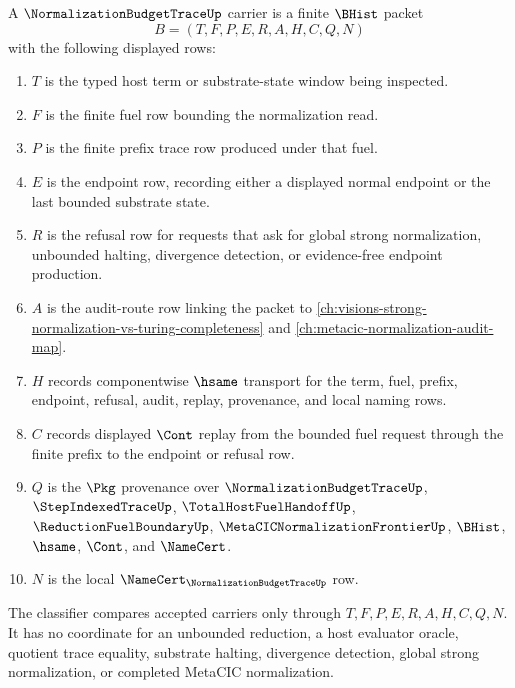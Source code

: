 \begin{definition}
\label{def:normalization-budget-trace-carrier}
A $\NormalizationBudgetTraceUp$ carrier is a finite $\BHist$ packet
$$
B=(T,F,P,E,R,A,H,C,Q,N)
$$
with the following displayed rows:
\begin{enumerate}
\item $T$ is the typed host term or substrate-state window being inspected.
\item $F$ is the finite fuel row bounding the normalization read.
\item $P$ is the finite prefix trace row produced under that fuel.
\item $E$ is the endpoint row, recording either a displayed normal endpoint or the last bounded substrate state.
\item $R$ is the refusal row for requests that ask for global strong normalization, unbounded halting, divergence detection, or evidence-free endpoint production.
\item $A$ is the audit-route row linking the packet to \autoref{ch:visions-strong-normalization-vs-turing-completeness} and \autoref{ch:metacic-normalization-audit-map}.
\item $H$ records componentwise $\hsame$ transport for the term, fuel, prefix, endpoint, refusal, audit, replay, provenance, and local naming rows.
\item $C$ records displayed $\Cont$ replay from the bounded fuel request through the finite prefix to the endpoint or refusal row.
\item $Q$ is the $\Pkg$ provenance over $\NormalizationBudgetTraceUp$, $\StepIndexedTraceUp$, $\TotalHostFuelHandoffUp$, $\ReductionFuelBoundaryUp$, $\MetaCICNormalizationFrontierUp$, $\BHist$, $\hsame$, $\Cont$, and $\NameCert$.
\item $N$ is the local $\NameCert_{\NormalizationBudgetTraceUp}$ row.
\end{enumerate}
The classifier compares accepted carriers only through $T,F,P,E,R,A,H,C,Q,N$. It has no coordinate for an unbounded reduction, a host evaluator oracle, quotient trace equality, substrate halting, divergence detection, global strong normalization, or completed MetaCIC normalization.
\end{definition}

